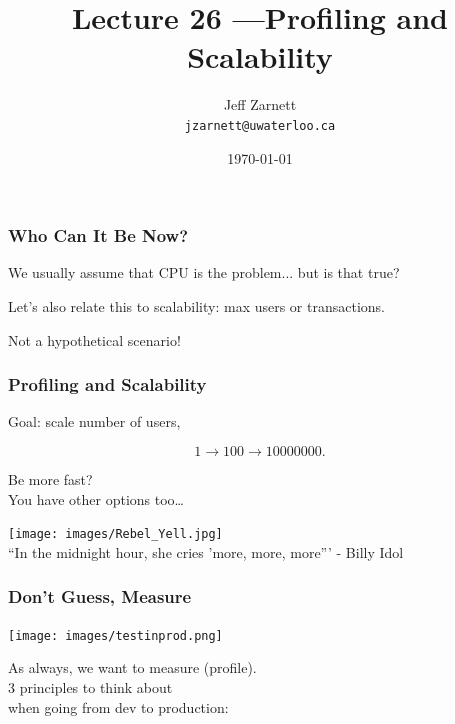 

\title{Lecture 26 ---Profiling and Scalability}

\author{Jeff Zarnett\\ \small \texttt{jzarnett@uwaterloo.ca}}
\date{\today}




\begin{frame}
  \titlepage

 \end{frame}


\begin{frame}
\frametitle{Who Can It Be Now?}

We usually assume that CPU is the problem... but is that true?

Let's also relate this to scalability: max users or transactions.

Not a hypothetical scenario!

\end{frame}



\begin{frame}
\frametitle{Profiling and Scalability}


Goal: scale number of users,

\[ 1 \rightarrow 100 \rightarrow 10 000 000. \]

Be more fast? \\
You have other options too\ldots


\begin{center}
	\texttt{[image: images/Rebel\_Yell.jpg]}\\
	\hfill ``In the midnight hour, she cries 'more, more, more''' - Billy Idol
\end{center}

\end{frame}


\begin{frame}
\frametitle{Don't Guess, Measure}


\begin{center}
	\texttt{[image: images/testinprod.png]}
\end{center}


As always, we want to measure (profile).\\[1em]
3 principles to think about\\
when going from dev to production:




\end{frame}



